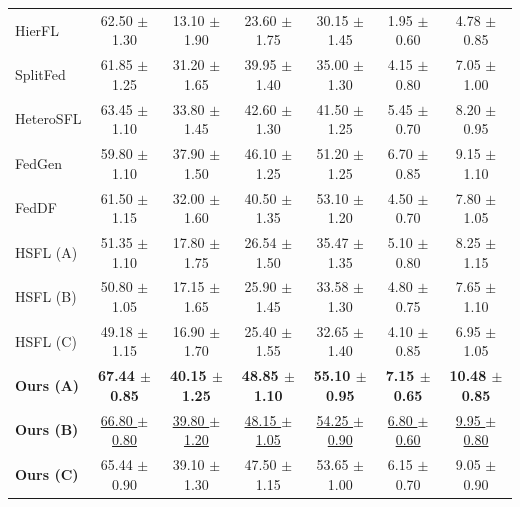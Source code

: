 \begin{table}[htbp]
{\begin{tabular}{l|ccc|ccc}
        HierFL & 62.50 {\scriptsize $\pm$ 1.30} & 13.10 {\scriptsize $\pm$ 1.90} & 23.60 {\scriptsize $\pm$ 1.75} & 30.15 {\scriptsize $\pm$ 1.45} & 1.95 {\scriptsize $\pm$ 0.60} & 4.78 {\scriptsize $\pm$ 0.85} \\
        SplitFed & 61.85 {\scriptsize $\pm$ 1.25} & 31.20 {\scriptsize $\pm$ 1.65} & 39.95 {\scriptsize $\pm$ 1.40} & 35.00 {\scriptsize $\pm$ 1.30} & 4.15 {\scriptsize $\pm$ 0.80} & 7.05 {\scriptsize $\pm$ 1.00} \\
        HeteroSFL & 63.45 {\scriptsize $\pm$ 1.10} & 33.80 {\scriptsize $\pm$ 1.45} & 42.60 {\scriptsize $\pm$ 1.30} & 41.50 {\scriptsize $\pm$ 1.25} & 5.45 {\scriptsize $\pm$ 0.70} & 8.20 {\scriptsize $\pm$ 0.95} \\
        FedGen & 59.80 {\scriptsize $\pm$ 1.10} & 37.90 {\scriptsize $\pm$ 1.50} & 46.10 {\scriptsize $\pm$ 1.25} & 51.20 {\scriptsize $\pm$ 1.25} & 6.70 {\scriptsize $\pm$ 0.85} & 9.15 {\scriptsize $\pm$ 1.10} \\
        FedDF & 61.50 {\scriptsize $\pm$ 1.15} & 32.00 {\scriptsize $\pm$ 1.60} & 40.50 {\scriptsize $\pm$ 1.35} & 53.10 {\scriptsize $\pm$ 1.20} & 4.50 {\scriptsize $\pm$ 0.70} & 7.80 {\scriptsize $\pm$ 1.05} \\
        \midrule
        HSFL (A) & 51.35 {\scriptsize $\pm$ 1.10} & 17.80 {\scriptsize $\pm$ 1.75} & 26.54 {\scriptsize $\pm$ 1.50} & 35.47 {\scriptsize $\pm$ 1.35} & 5.10 {\scriptsize $\pm$ 0.80} & 8.25 {\scriptsize $\pm$ 1.15} \\
        HSFL (B) & 50.80 {\scriptsize $\pm$ 1.05} & 17.15 {\scriptsize $\pm$ 1.65} & 25.90 {\scriptsize $\pm$ 1.45} & 33.58 {\scriptsize $\pm$ 1.30} & 4.80 {\scriptsize $\pm$ 0.75} & 7.65 {\scriptsize $\pm$ 1.10} \\
        HSFL (C) & 49.18 {\scriptsize $\pm$ 1.15} & 16.90 {\scriptsize $\pm$ 1.70} & 25.40 {\scriptsize $\pm$ 1.55} & 32.65 {\scriptsize $\pm$ 1.40} & 4.10 {\scriptsize $\pm$ 0.85} & 6.95 {\scriptsize $\pm$ 1.05} \\
        \midrule
        \textbf{Ours (A)} & \textbf{67.44 {\scriptsize $\pm$ 0.85}} & \textbf{40.15 {\scriptsize $\pm$ 1.25}} & \textbf{48.85 {\scriptsize $\pm$ 1.10}} & \textbf{55.10 {\scriptsize $\pm$ 0.95}} & \textbf{7.15 {\scriptsize $\pm$ 0.65}} & \textbf{10.48 {\scriptsize $\pm$ 0.85}} \\
        \textbf{Ours (B)} & \underline{66.80 {\scriptsize $\pm$ 0.80}} & \underline{39.80 {\scriptsize $\pm$ 1.20}} & \underline{48.15 {\scriptsize $\pm$ 1.05}} & \underline{54.25 {\scriptsize $\pm$ 0.90}} & \underline{6.80 {\scriptsize $\pm$ 0.60}} & \underline{9.95 {\scriptsize $\pm$ 0.80}} \\
        \textbf{Ours (C)} & 65.44 {\scriptsize $\pm$ 0.90} & 39.10 {\scriptsize $\pm$ 1.30} & 47.50 {\scriptsize $\pm$ 1.15} & 53.65 {\scriptsize $\pm$ 1.00} & 6.15 {\scriptsize $\pm$ 0.70} & 9.05 {\scriptsize $\pm$ 0.90} \\
        \bottomrule
    \end{tabular}
    }
\end{table}
